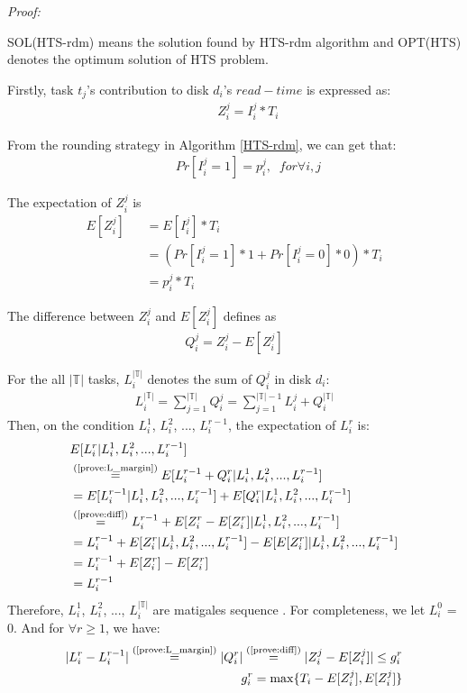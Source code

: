 \documentclass[conference]{IEEEtran}
\begin{document}
\emph{Proof:}

SOL(HTS-rdm) means the solution found by HTS-rdm algorithm and  OPT(HTS) denotes the optimum solution of HTS problem.

Firstly, task $t_j$'s contribution to disk $d_i$'s $read-time$ is expressed as:
 \begin{align}
&\;\;\;\;\;Z_i^j = I_i^j*T_i
\end{align}

From the rounding strategy in Algorithm \ref{HTS-rdm}, we can get that:
 \begin{align}
&\;\;\;\;\;Pr[I_i^j = 1] = p_i^j,\;\;for\forall i,j \nonumber
\end{align}

The expectation of $Z_i^j$ is
\begin{align}
E[Z_i^j] &\;\;\;= E[I_i^j]*T_i \nonumber\\
&\;\;\;= (Pr[I_i^j = 1] * 1 + Pr[I_i^j = 0] * 0)*T_i \nonumber\\
&\;\;\;= p_i^j*T_i\label{prove:expect}
\end{align}

The difference between $Z_i^j$ and $E[Z_i^j]$ defines as
\begin{align}
Q_i^j = Z_i^j - E[Z_i^j]\label{prove:diff}
\end{align}

For the all $\mathbb{|T|}$ tasks, $L_i^{\mathbb{|T|}}$ denotes the sum of $Q_i^j$ in disk $d_i$:
\begin{align}
L_i^{\mathbb{|T|}} = \sum_{j = 1}^{\mathbb{|T|}} Q_i^j
= \sum_{j = 1}^{\mathbb{|T|} - 1} L_i^j + Q_i^{\mathbb{|T|}} \label{prove:L_margin}
\end{align}
Then, on the condition $L_i^{1}$, $L_i^{2}$, ..., $L_i^{r-1}$, the expectation of $L_i^{r}$ is:
\begin{align}
&E[L_i^{r}|L_i^{1}, L_i^{2}, ..., L_i^{r-1}] \nonumber\\
&\overset{\text{(\ref{prove:L_margin})}}{=}E[L_i^{r-1} + Q_i^{r} |L_i^{1}, L_i^{2}, ..., L_i^{r-1}] \nonumber\\
&\overset{\text{}}{=}E[L_i^{r-1} |L_i^{1}, L_i^{2}, ..., L_i^{r-1}]
+ E[Q_i^{r} |L_i^{1}, L_i^{2}, ..., L_i^{r-1}] \nonumber\\
&\overset{\text{(\ref{prove:diff})}}{=}L_i^{r-1} + E[Z_i^r - E[Z_i^r] |L_i^{1}, L_i^{2}, ..., L_i^{r-1}]\nonumber\\
&=L_i^{r-1} + E[Z_i^r|L_i^{1}, L_i^{2}, ..., L_i^{r-1}]
-E[E[Z_i^r] |L_i^{1}, L_i^{2}, ..., L_i^{r-1}]\nonumber\\
&=L_i^{r-1} + E[Z_i^r] - E[Z_i^r]\nonumber\\
&=L_i^{r-1}\label{prove:marginsq}
\end{align}
Therefore, $L_i^{1}$, $L_i^{2}$, ..., $L_i^{|\mathbb{T}|}$ are matigales sequence \cite{b13}. For completeness, we let $L_i^{0}$ = 0. And for $\forall r \geq 1$, we have:
\begin{align}
  |L_i^r - L_i^{r-1}|\overset{\text{(\ref{prove:L_margin})}}{=} |Q_i^{r}| \overset{\text{(\ref{prove:diff})}}{=} |Z_i^j - E[Z_i^j]|\leq g_i^r\\
  g_i^r = \max\{T_i -  E[Z_i^j], E[Z_i^j]\}\label{prove:bound}
\end{align}
\end{document}
